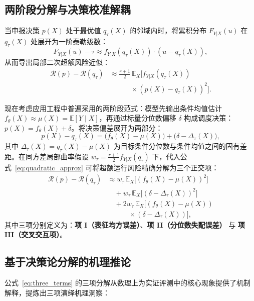 \subsection{两阶段分解与决策校准解耦}
当申报决策 $p(X)$ 处于最优值 $q_\tau(X)$ 的邻域内时，将累积分布 $F_{Y|X}(u)$ 在 $q_\tau(X)$ 处展开为一阶泰勒级数：
\begin{equation}
F_{Y|X}(u) - \tau \approx f_{Y|X}(q_\tau(X)) \cdot (u - q_\tau(X)),
\end{equation}
从而导出局部二次超额风险近似：
\begin{equation}
\begin{aligned}
\mathcal{R}(p) - \mathcal{R}(q_\tau) &\approx \frac{r+1}{2} \, \mathbb{E}_X \big[ f_{Y|X}(q_\tau(X)) \\
&\qquad\quad \times ( p(X) - q_\tau(X) )^2 \big].
\end{aligned}
\label{eq:quadratic_approx}
\end{equation}

现在考虑应用工程中普遍采用的两阶段范式：模型先输出条件均值估计 $f_\theta(X) \approx \mu(X) = \mathbb{E}[Y \mid X]$，再通过标量分位数偏移 $\delta$ 构成调度决策：$p(X) = f_\theta(X) + \delta$。将决策偏差展开为两部分：
\begin{equation}
p(X) - q_\tau(X) = \big( f_\theta(X) - \mu(X) \big) + \big( \delta - \Delta_\tau(X) \big),
\end{equation}
其中 $\Delta_\tau(X) = q_\tau(X) - \mu(X)$ 为目标条件分位数与条件均值之间的固有差距。在同方差局部曲率假设 $w_\tau = \frac{r+1}{2} f_{Y|X}(q_\tau)$ 下，代入公式~\eqref{eq:quadratic_approx} 可将超额运行风险精确分解为三个正交项：
\begin{equation}
\begin{aligned}
\mathcal{R}(p) - \mathcal{R}(q_\tau) &\approx w_\tau \, \mathbb{E}_X \big[ (f_\theta(X) - \mu(X))^2 \big] \\
&\quad + w_\tau \, \mathbb{E}_X \big[ (\delta - \Delta_\tau(X))^2 \big] \\
&\quad + 2 w_\tau \, \mathbb{E}_X \big[ (f_\theta(X) - \mu(X)) \\
&\qquad\quad \times (\delta - \Delta_\tau(X)) \big],
\end{aligned}
\label{eq:three_terms}
\end{equation}
其中三项分别定义为：\textbf{项 I（表征均方误差）}、\textbf{项 II（分位数失配误差）} 与 \textbf{项 III（交叉交互项）}。

\subsection{基于决策论分解的机理推论}
公式~\eqref{eq:three_terms} 的三项分解从数理上为实证评测中的核心现象提供了机制解释，提炼出三项演绎机理洞察：

